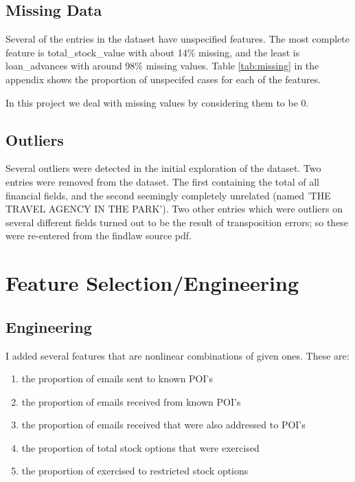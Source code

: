 \documentclass{article}
\begin{document}
\subsection{Missing Data}

Several of the entries in the dataset have unspecified features. The most complete feature is total\_stock\_value with about 14\% missing, and the least is loan\_advances with around 98\% missing values. Table \ref{tab:missing} in the appendix shows the proportion of unspecifed cases for each of the features.

In this project we deal with missing values by considering them to be 0. 

\subsection{Outliers}

Several outliers were detected in the initial exploration of the dataset. Two entries were removed from the dataset. The first containing the total of all financial fields, and the second seemingly completely unrelated (named 'THE TRAVEL AGENCY IN THE PARK'). Two other entries which were outliers on several different fields turned out to be the result of transposition errors; so these were re-entered from the findlaw source pdf.

\section{Feature Selection/Engineering}


\subsection{Engineering}

I added several features that are nonlinear combinations of given ones. These are:

\begin{enumerate}
\item{the proportion of emails sent to known POI's}
\item{the proportion of emails received from known POI's}
\item{the proportion of emails received that were also addressed to POI's}
\item{the proportion of total stock options that were exercised}
\item{the proportion of exercised to restricted stock options}
\end{enumerate}
\end{document}
